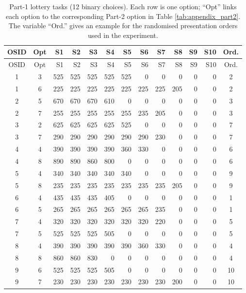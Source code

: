 {\small
\setlength{\tabcolsep}{3pt}
\begin{longtable}{cc*{10}{r}c}
\caption{Part-1 lottery tasks (12 binary choices). Each row is one option; ``Opt'' links each option to the corresponding Part-2 option in Table \ref{tab:appendix_part2}. The variable ``Ord.'' gives an example for the randomised presentation orders used in the experiment.}
\label{tab:appendix_part1}\\
\toprule
OSID & Opt & S1 & S2 & S3 & S4 & S5 & S6 & S7 & S8 & S9 & S10 & Ord. \\
\midrule
\endfirsthead
\toprule
OSID & Opt & S1 & S2 & S3 & S4 & S5 & S6 & S7 & S8 & S9 & S10 & Ord. \\
\midrule
\endhead
1 & 3 & 525 & 525 & 525 & 525 & 525 & 0 & 0 & 0 & 0 & 0 & 2 \\
1 & 6 & 225 & 225 & 225 & 225 & 225 & 225 & 225 & 205 & 0 & 0 & 2 \\\midrule
2 & 5 & 670 & 670 & 670 & 610 & 0 & 0 & 0 & 0 & 0 & 0 & 3 \\
2 & 7 & 255 & 255 & 255 & 255 & 255 & 235 & 205 & 0 & 0 & 0 & 3 \\\midrule
3 & 2 & 625 & 625 & 625 & 625 & 525 & 0 & 0 & 0 & 0 & 0 & 7 \\
3 & 7 & 290 & 290 & 290 & 290 & 290 & 290 & 230 & 0 & 0 & 0 & 7 \\\midrule
4 & 4 & 390 & 390 & 390 & 390 & 360 & 330 & 0 & 0 & 0 & 0 & 6 \\
4 & 8 & 890 & 890 & 860 & 800 & 0 & 0 & 0 & 0 & 0 & 0 & 6 \\\midrule
5 & 4 & 340 & 340 & 340 & 340 & 340 & 0 & 0 & 0 & 0 & 0 & 9 \\
5 & 8 & 235 & 235 & 235 & 235 & 235 & 235 & 235 & 205 & 0 & 0 & 9 \\\midrule
6 & 4 & 435 & 435 & 435 & 405 & 0 & 0 & 0 & 0 & 0 & 0 & 1 \\
6 & 5 & 265 & 265 & 265 & 265 & 265 & 265 & 235 & 0 & 0 & 0 & 1 \\\midrule
7 & 4 & 320 & 320 & 320 & 320 & 320 & 320 & 220 & 0 & 0 & 0 & 5 \\
7 & 5 & 525 & 525 & 525 & 505 & 0 & 0 & 0 & 0 & 0 & 0 & 5 \\\midrule
8 & 4 & 390 & 390 & 390 & 390 & 390 & 360 & 330 & 0 & 0 & 0 & 4 \\
8 & 8 & 860 & 860 & 830 & 0 & 0 & 0 & 0 & 0 & 0 & 0 & 4 \\\midrule
9 & 6 & 525 & 525 & 525 & 505 & 0 & 0 & 0 & 0 & 0 & 0 & 10 \\
9 & 7 & 230 & 230 & 230 & 230 & 230 & 230 & 230 & 200 & 0 & 0 & 10\\\midrule 

\end{longtable}}
